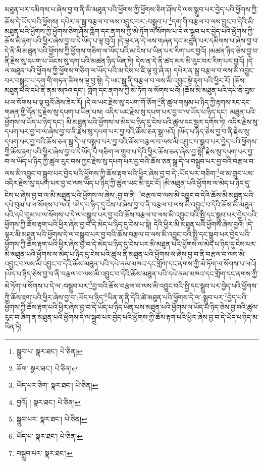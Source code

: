 མཐུན་པར་དམིགས་པ་ཞེས་བྱ་བ་ནི་མི་མཐུན་པའི་ཕྱོགས་ཀྱི་ཕྱོགས་ཅིག་ཤོས་དེ་ལས་སྒྲུབ་པར་བྱེད་པའི་ཕྱོགས་ཀྱི་ཆོས་དེ་ཡོད་པའི་ཕྱོགས། དཔེར་ན་སྒྲ་བརྩལ་བ་ལས་འབྱུང་བར་:བསྒྲུབ་པ་\footnote{སྒྲུབ་པ་  སྣར་ཐང་།  པེ་ཅིན། }དག་གི་བརྩལ་བ་ལས་བྱུང་བ་དེའི་མི་མཐུན་པའི་ཕྱོགས་ཀྱི་ཕྱོགས་ཅིག་ཤོས་གློག་དང་ནགས་ཀྱི་མེ་ཏོག་ལ་སོགས་པ་དེ་ལ་སྒྲུབ་པར་བྱེད་པའི་ཕྱོགས་ཀྱི་ཆོས་མི་རྟག་པའི་ཕྱིར་ཞེས་བྱ་བ་དེ་ཡོད་པ་ལྟ་བུའོ། །དེ་ལྟར་ན་དེ་ལས་གཞན་དང་མཐུན་པར་དམིགས་པ་ཞེས་བྱ་བ་དེ་ནི་མི་མཐུན་པའི་ཕྱོགས་ཀྱི་ཕྱོགས་གཅིག་ལ་ཡོད་པའི་མ་ངེས་པ་ཡིན་པར་རིག་པར་བྱའོ། །མཚན་ཉིད་ཅེས་བྱ་བ་ནི་རྗེས་སུ་དཔག་པ་ཡོངས་སུ་དག་པའི་མཚན་ཉིད་ཡིན་ཏེ། དེས་ན་དེ་ནི་ཚད་མར་མི་རུང་བར་རིག་པར་བྱའོ། །དེ་ལ་མཐུན་པའི་ཕྱོགས་ཀྱི་ཕྱོགས་གཅིག་ལ་ཡོད་པའི་མ་ངེས་པ་ཇི་ལྟ་བུ་ཞེ་ན། དཔེར་ན་སྒྲ་བརྩལ་བ་ལས་མི་འབྱུང་བར་བསྒྲུབ་པ་དག་གི་གཏན་ཚིགས་ལྟ་བུ་སྟེ། དེ་ཡང་སྒྲ་ནི་བརྩལ་བ་ལས་མི་འབྱུང་སྟེ་རྟག་པའི་ཕྱིར་རོ། །ཆོས་མཐུན་པའི་དཔེ་ནི་ནམ་མཁའ་དང་། གློག་དང་ནགས་ཀྱི་མེ་ཏོག་ལ་སོགས་པའོ། །ཆོས་མི་མཐུན་པའི་དཔེ་ནི་བུམ་པ་ལ་སོགས་པ་ལྟ་བུའོ་ཞེས་ཟེར་རོ། །དེ་ལ་ཡང་རྗེས་སུ་དཔག་གོ་ཅོག་\footnote{ཆོག་  སྣར་ཐང་།  པེ་ཅིན། }ནི་ཚུལ་གསུམ་པ་ཉིད་ཀྱི་རྟགས་རང་དང་གཞན་གྱི་དོན་དུ་རྗེས་སུ་དཔག་པ་ཡིན་པས། འདིར་ཡང་རྗེས་སུ་དཔག་པར་བྱ་བ་ལ་ཡོད་པ་ཉིད་དང་། མཐུན་པའི་ཕྱོགས་ལ་ཡོད་པ་ཉིད་དང་། མི་མཐུན་པའི་ཕྱོགས་ལ་མེད་པ་ཉིད་དུ་ངེས་པའི་ཚུལ་དང་སྦྱར་དགོས་ཏེ། འདིར་རྗེས་སུ་དཔག་པར་བྱ་བ་ལ་ཞེས་བྱ་བ་ནི་རྗེས་སུ་དཔག་པར་བྱ་བའི་ཆོས་ཅན་སྒྲ་ལའོ། །ཡོད་པ་ཉིད་ཅེས་བྱ་བ་ནི་རྗེས་སུ་དཔག་པར་བྱ་བའི་ཆོས་ཅན་སྒྲ་དེ་ལ་བསྒྲུབ་པར་བྱ་བའི་ཆོས་བརྩལ་བ་ལས་མི་འབྱུང་བ་སྒྲུབ་པར་བྱེད་པའི་ཕྱོགས་ཀྱི་ཆོས་རྟག་པའི་ཕྱིར་ཞེས་བྱ་བ་དེ་ཡོད་པ་གཅིག་ལ་གྲུབ་པ་དེའི་ཕྱིར་ཆོས་ཅན་ཞེས་བྱ་སྟེ། རྗེས་སུ་དཔག་པར་བྱ་བ་ལ་ཡོད་པ་ཉིད་ཀྱི་ཚུལ་རུང་བས་ཀྱང་རྗེས་སུ་དཔག་པར་བྱ་བའི་ཆོས་ཅན་སྒྲ་དེ་ལ་བསྒྲུབ་པར་བྱ་བའི་བརྩལ་བ་ལས་མི་འབྱུང་བ་སྒྲུབ་པར་བྱེད་པའི་ཕྱོགས་ཀྱི་ཆོས་རྟག་པའི་ཕྱིར་ཞེས་བྱ་བ་དེ་:ཡོད་པར་གཅིག་\footnote{ཡོད་པར་ཅིག་  སྣར་ཐང་།  པེ་ཅིན། }ལ་མ་གྲུབ་པས་འདིར་རྗེས་སུ་དཔག་པར་བྱ་བ་ལས་ཡོད་པ་ཉིད་ཀྱི་ཚུལ་ཡང་མི་རུང་ངོ། །མི་མཐུན་པའི་ཕྱོགས་ལ་མེད་པ་ཉིད་དུ་ངེས་པ་ཞེས་བྱ་བ་ལ་མི་མཐུན་པའི་ཕྱོགས་ལ་ཞེས་:བྱ་བ་ནི། \footnote{བྱའོ། །   སྣར་ཐང་།  པེ་ཅིན། }བརྩལ་བ་ལས་མི་འབྱུང་བ་དེའི་ཆོས་མི་མཐུན་པའི་དཔེ་བུམ་པ་ལ་སོགས་པ་ལའོ། །མེད་པ་ཉིད་དུ་ངེས་པ་ཞེས་བྱ་བ་ནི་བརྩལ་བ་ལས་མི་འབྱུང་བ་དེའི་ཆོས་མི་མཐུན་པའི་དཔེ་བུམ་པ་ལ་སོགས་པ་དེ་ལ་བསྒྲུབ་པར་བྱ་བའི་ཆོས་བརྩལ་བ་ལས་མི་འབྱུང་བའི་སྤྱི་དང་སྒྲུབ་པར་བྱེད་པའི་ཕྱོགས་ཀྱི་ཆོས་རྟག་པའི་ཕྱིར་ཞེས་བྱ་བ་དེ་མེད་པ་ཉིད་དུ་ངེས་པ་སྟེ། དེའི་ཕྱིར་མི་མཐུན་པའི་ཕྱོགས་ཞེས་བྱའོ། །དེ་ལྟར་མི་མཐུན་པའི་ཕྱོགས་དེ་ལ་བསྒྲུབ་པར་བྱ་བའི་ཆོས་བརྩལ་བ་ལས་མི་འབྱུང་བའི་སྤྱི་དང་སྒྲུབ་པར་བྱེད་པའི་ཕྱོགས་ཀྱི་ཆོས་རྟག་པའི་ཕྱིར་ཞེས་བྱ་བ་དེ་མེད་པ་ཉིད་དུ་ངེས་པར་མི་མཐུན་པའི་ཕྱོགས་ལ་མེད་པ་ཉིད་དུ་ངེས་པར་མི་མཐུན་པའི་ཕྱོགས་ལ་མེད་པ་ཉིད་དུ་ངེས་པའི་ཚུལ་ནི་མཐུན་པའི་ཕྱོགས་ལ་ཞེས་བྱ་བ་ནི་བརྩལ་བ་ལས་མི་འབྱུང་བ་ལས་མི་འབྱུང་བ་དེའི་ཆོས་མཐུན་པའི་དཔེ་ནམ་མཁའ་དང་གློག་དང་ནགས་ཀྱི་མེ་ཏོག་ལ་སོགས་པ་ལའོ། །ཡོད་པ་ཉིད་ཅེས་བྱ་བ་ནི་བརྩལ་བ་ལས་མི་འབྱུང་བ་དེའི་ཆོས་མཐུན་པའི་དཔེ་ནམ་མཁའ་དང་གློག་དང་ནགས་ཀྱི་མེ་ཏོག་ལ་སོགས་པ་དེ་ལ་:བསྒྲུབ་པར་\footnote{སྒྲུབ་པར་  སྣར་ཐང་།  པེ་ཅིན། }བྱ་བའི་ཆོས་བརྩལ་བ་ལས་མི་འབྱུང་བའི་སྤྱི་དང་སྒྲུབ་པར་བྱེད་པའི་ཕྱོགས་ཀྱི་ཆོས་རྟག་པའི་ཕྱིར་ཞེས་བྱ་བ་:ཡོད་པ་ཉིད་\footnote{ཡོད་པ་  སྣར་ཐང་།  པེ་ཅིན། }ཡིན་ན་ནི་དེའི་ཚེ་མཐུན་པའི་ཕྱོགས་དེ་ལ་:སྒྲུབ་པར་\footnote{བསྒྲུབ་པར་  སྣར་ཐང་། }བྱེད་པའི་ཕྱོགས་ཀྱི་ཆོས་རྟག་པའི་ཕྱིར་ཞེས་བྱ་བ་དེ་ཡོད་པ་ཉིད་ཡིན་པས་མཐུན་པའི་ཕྱོགས་ལ་ཡོད་པ་ཉིད་ཅེས་བྱ་བའི་ཚུལ་རུང་བ་ཞིག་ན་མཐུན་པའི་ཕྱོགས་དེ་ལ་སྒྲུབ་པར་བྱེད་པའི་ཕྱོགས་ཀྱི་ཆོས་རྟག་པའི་ཕྱིར་ཞེས་བྱ་བ་དེ་ཡོད་པ་ཉིད་མ་ཡིན་ཏེ། 